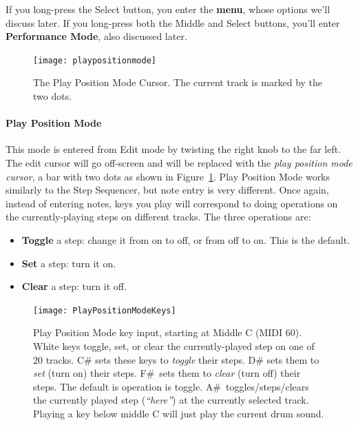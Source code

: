 \documentclass{article}
\begin{document}
If you long-press the Select button, you enter the {\bf menu}, whose options we'll discuss later.    If you long-press both the Middle and Select buttons, you'll enter {\bf Performance Mode}, also discussed later.

\begin{figure}
\vspace{-1em}
\hspace{\fill}\texttt{[image: playpositionmode]}\hspace{\fill}
\caption{\small The Play Position Mode Cursor.  The current track is marked by the two dots.}
\vspace{-4em}
\label{playpositionmode2}
\end{figure}



\paragraph{Play Position Mode}  This mode is entered from Edit mode by twisting the right knob to the far left.  The edit cursor will go off-screen and will be replaced with the {\it play position mode cursor}, a bar with two dots as shown in Figure~\ref{playpositionmode2}.  Play Position Mode works similarly to the Step Sequencer,  but note entry is very different.   Once again, instead of entering notes, keys you play will correspond to doing operations on the currently-playing steps on different tracks. The three operations are:

\enlargethispage{1em}

\begin{itemize}
\item {\bf Toggle} a step: change it from on to off, or from off to on.  This is the default.
\item {\bf Set} a step: turn it on.
\item {\bf Clear} a step: turn it off.
\end{itemize}

\begin{figure}
\vspace{-1em}
\hspace{\fill}\texttt{[image: PlayPositionModeKeys]}
\vspace{-1em}
\caption{\small Play Position Mode key input, starting at Middle C (MIDI 60).  White keys toggle, set, or clear the currently-played step on one of 20 tracks.  C\# sets these keys to {\it toggle} their steps.  D\# sets them to {\it set} (turn on) their steps.  F\#~sets them to {\it clear} (turn off) their steps.  The default is operation is toggle.  A\#~toggles/steps/clears the currently played step ({\it ``here''}) at the currently selected track.  Playing a key below middle C will just play the current drum sound. }
\label{playpositionmodekeys}
\end{figure}
\end{document}
